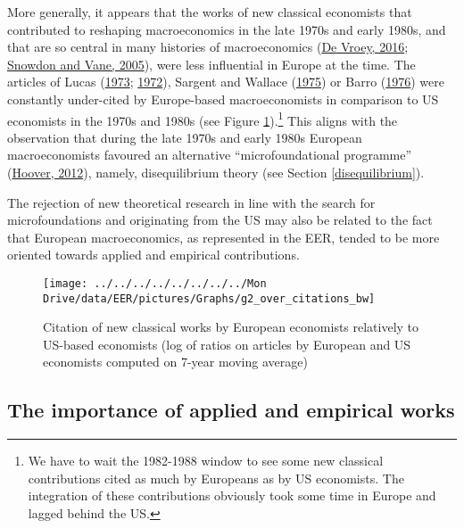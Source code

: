 \documentclass[
  12pt,
  onecolumn]{article}
\begin{document}
More generally, it appears that the works of new classical economists that contributed to reshaping macroeconomics in the late 1970s and early 1980s, and that are so central in many histories of macroeconomics (\protect\hyperlink{ref-devroey2016}{De Vroey, 2016}; \protect\hyperlink{ref-snowdon2005}{Snowdon and Vane, 2005}), were less influential in Europe at the time. The articles of Lucas (\protect\hyperlink{ref-lucas1973}{1973}; \protect\hyperlink{ref-lucas1972}{1972}), Sargent and Wallace (\protect\hyperlink{ref-sargent1975}{1975}) or Barro (\protect\hyperlink{ref-barro1976}{1976}) were constantly under-cited by Europe-based macroeconomists in comparison to US economists in the 1970s and 1980s (see Figure \ref{fig:plot-new-classical}).\footnote{We have to wait the 1982-1988 window to see some new classical contributions cited as much by Europeans as by US economists. The integration of these contributions obviously took some time in Europe and lagged behind the US.} This aligns with the observation that during the late 1970s and early 1980s European macroeconomists favoured an alternative ``microfoundational programme'' (\protect\hyperlink{ref-hoover2012}{Hoover, 2012}), namely, disequilibrium theory (see Section \ref{disequilibrium}).

The rejection of new theoretical research in line with the search for microfoundations and originating from the US may also be related to the fact that European macroeconomics, as represented in the EER, tended to be more oriented towards applied and empirical contributions.

\begin{figure}[H]

{\centering \texttt{[image: ../../../../../../../../Mon Drive/data/EER/pictures/Graphs/g2\_over\_citations\_bw]} 

}

\caption{Citation of new classical works by European economists relatively to US-based economists (log of ratios on articles by European and US economists computed on 7-year moving average)}\label{fig:plot-new-classical}
\end{figure}

\hypertarget{the-importance-of-applied-and-empirical-works}{%
\subsection{The importance of applied and empirical works}\label{the-importance-of-applied-and-empirical-works}}
\end{document}
